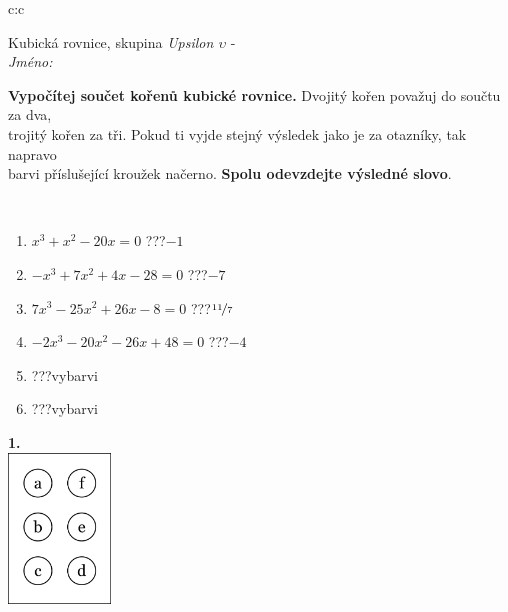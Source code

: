 \documentclass[10pt]{report}
\begin{document}
\begin{tabular}{c:c}
\begin{minipage}[c][104.5mm][t]{0.5\linewidth}
\begin{center}
\vspace{7mm}
{\huge Kubická rovnice, skupina \textit{Upsilon $\upsilon$} -}\\[5mm]
\textit{Jméno:}\phantom{xxxxxxxxxxxxxxxxxxxxxxxxxxxxxxxxxxxxxxxxxxxxxxxxxxxxxxxxxxxxxxxxx}\\[5mm]
\begin{minipage}{0.95\linewidth}
\begin{center}
\textbf{Vypočítej součet kořenů kubické rovnice.} Dvojitý kořen považuj do součtu za dva,\\trojitý kořen za tři. Pokud ti vyjde stejný výsledek jako je za otazníky, tak napravo\\barvi příslušející kroužek načerno. \textbf{Spolu odevzdejte výsledné slovo}.
\end{center}
\end{minipage}
\\[1mm]
\begin{minipage}{0.79\linewidth}
\begin{center}
\begin{varwidth}{\linewidth}
\begin{enumerate}
\Large
\item $x^3+x^2-20x=0$\quad \dotfill\; ???\;\dotfill \quad $-1$
\item $-x^3+7x^2+4x-28=0$\quad \dotfill\; ???\;\dotfill \quad $-7$
\item $7x^3-25x^2+26x-8=0$\quad \dotfill\; ???\;\dotfill \quad $\nicefrac{11}{7}$
\item $-2x^3-20x^2-26x+48=0$\quad \dotfill\; ???\;\dotfill \quad $-4$
\item \quad \dotfill\; ???\;\dotfill \quad vybarvi
\item \quad \dotfill\; ???\;\dotfill \quad vybarvi
\end{enumerate}
\end{varwidth}
\end{center}
\end{minipage}
\begin{minipage}{0.20\linewidth}
\begin{center}
{\Huge\bfseries 1.} \\[2mm]
\includegraphics[height=40mm]{../images/braille.png}

\end{center}
\end{minipage}
\end{center}
\end{minipage}
\end{tabular}
\end{document}
